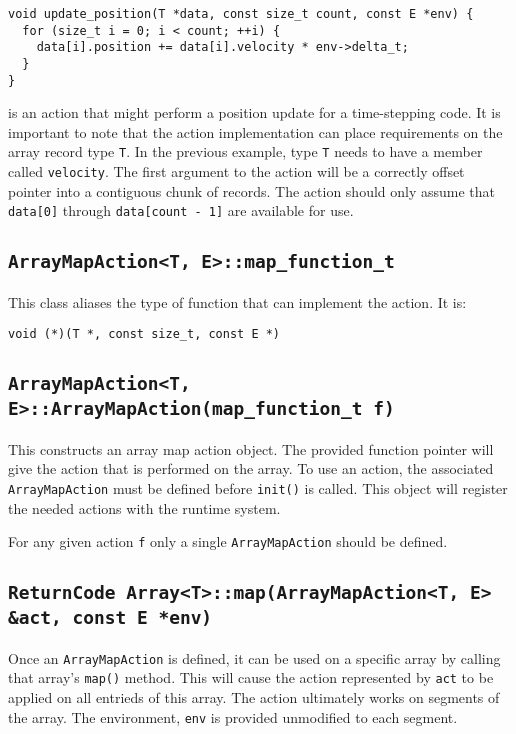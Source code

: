 \documentclass[11pt]{book}
\begin{document}
\begin{verbatim}
void update_position(T *data, const size_t count, const E *env) {
  for (size_t i = 0; i < count; ++i) {
    data[i].position += data[i].velocity * env->delta_t;
  }
}
\end{verbatim}

is an action that might perform a position update for a time-stepping code.
It is important to note that the action implementation can place requirements
on the array record type {\tt T}. In the previous example, type {\tt T} needs to
have a member called {\tt velocity}. The first argument to the action will be a
correctly offset pointer into a contiguous chunk of records. The action should
only assume that {\tt data[0]} through {\tt data[count - 1]} are available for
use. 

\subsection{{\tt ArrayMapAction<T, E>::map\_function\_t}}

This class aliases the type of function that can implement the action. It is:

\begin{verbatim}
void (*)(T *, const size_t, const E *)
\end{verbatim}

\subsection{{\tt ArrayMapAction<T, E>::ArrayMapAction(map\_function\_t f)}}

This constructs an array map action object. The provided function pointer
will give the action that is performed on the array. To use an action,
the associated {\tt ArrayMapAction} must be defined before {\tt init()} is
called. This object will register the needed actions with the runtime system.

For any given action {\tt f} only a single {\tt ArrayMapAction}  
should be defined.

\subsection{{\tt ReturnCode Array<T>::map(ArrayMapAction<T, E> \&act, const E
    *env)}} 

Once an {\tt ArrayMapAction} is defined, it can be used on a specific array by
calling that array's {\tt map()} method. This will cause the action represented
by {\tt act} to be applied on all entrieds of this array. The action ultimately
works on segments of the array. The environment, {\tt env} is provided
unmodified to each segment.
\end{document}
